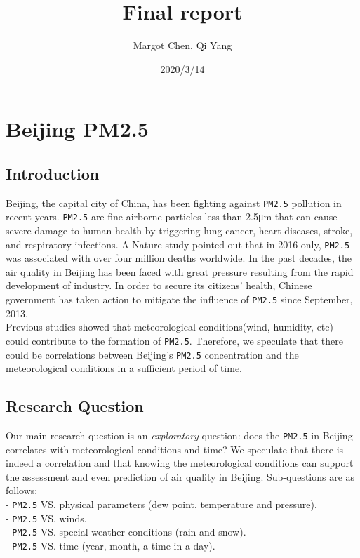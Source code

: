\documentclass[
]{article}
\title{Final report}
\author{Margot Chen, Qi Yang}
\date{2020/3/14}
\begin{document}
\maketitle

\hypertarget{beijing-pm2.5}{%
\section{Beijing PM2.5}\label{beijing-pm2.5}}

\hypertarget{introduction}{%
\subsection{Introduction}\label{introduction}}

Beijing, the capital city of China, has been fighting against
\texttt{PM2.5} pollution in recent years. \texttt{PM2.5} are fine
airborne particles less than 2.5μm that can cause severe damage to human
health by triggering lung cancer, heart diseases, stroke, and
respiratory infections. A Nature study pointed out that in 2016 only,
\texttt{PM2.5} was associated with over four million deaths worldwide.
In the past decades, the air quality in Beijing has been faced with
great pressure resulting from the rapid development of industry. In
order to secure its citizens' health, Chinese government has taken
action to mitigate the influence of \texttt{PM2.5} since September,
2013.\\
Previous studies showed that meteorological conditions(wind, humidity,
etc) could contribute to the formation of \texttt{PM2.5}. Therefore, we
speculate that there could be correlations between Beijing's
\texttt{PM2.5} concentration and the meteorological conditions in a
sufficient period of time.

\hypertarget{research-question}{%
\subsection{Research Question}\label{research-question}}

Our main research question is an \emph{exploratory} question: does the
\texttt{PM2.5} in Beijing correlates with meteorological conditions and
time? We speculate that there is indeed a correlation and that knowing
the meteorological conditions can support the assessment and even
prediction of air quality in Beijing. Sub-questions are as follows:\\
- \texttt{PM2.5} VS. physical parameters (dew point, temperature and
pressure).\\
- \texttt{PM2.5} VS. winds.\\
- \texttt{PM2.5} VS. special weather conditions (rain and snow).\\
- \texttt{PM2.5} VS. time (year, month, a time in a day).
\end{document}

